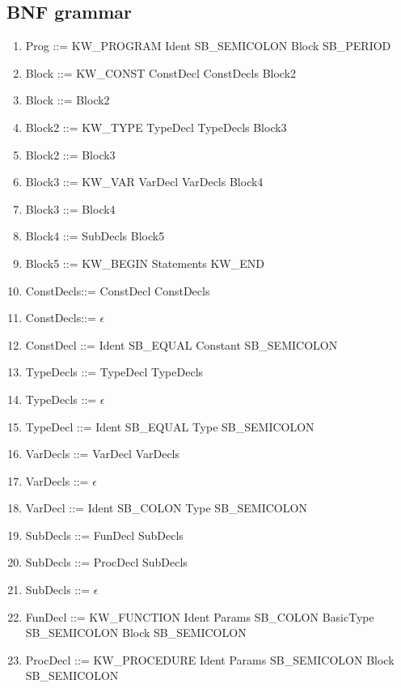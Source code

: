 \documentclass[12pt, a4paper]{report}
\begin{document}
			\subsection{BNF grammar}
				\begin{enumerate}
					\item Prog ::= KW\_PROGRAM Ident SB\_SEMICOLON Block SB\_PERIOD

					\item Block  ::= KW\_CONST ConstDecl ConstDecls Block2
					\item Block  ::= Block2

					\item Block2 ::= KW\_TYPE TypeDecl TypeDecls Block3
					\item Block2 ::= Block3

					\item Block3 ::= KW\_VAR VarDecl VarDecls Block4
					\item Block3 ::= Block4

					\item Block4 ::= SubDecls Block5
					\item Block5 ::= KW\_BEGIN Statements KW\_END

					\item ConstDecls::= ConstDecl ConstDecls
					\item ConstDecls::= $\epsilon$
					\item ConstDecl ::= Ident SB\_EQUAL Constant SB\_SEMICOLON

					\item TypeDecls ::= TypeDecl TypeDecls
					\item TypeDecls ::= $\epsilon$
					\item TypeDecl ::= Ident SB\_EQUAL Type SB\_SEMICOLON

					\item VarDecls ::= VarDecl VarDecls
					\item VarDecls ::= $\epsilon$
					\item VarDecl ::= Ident SB\_COLON Type SB\_SEMICOLON

					\item SubDecls ::= FunDecl SubDecls
					\item SubDecls ::= ProcDecl SubDecls
					\item SubDecls ::= $\epsilon$

					\item FunDecl ::= KW\_FUNCTION Ident Params SB\_COLON BasicType SB\_SEMICOLON Block SB\_SEMICOLON

					\item ProcDecl ::= KW\_PROCEDURE Ident Params SB\_SEMICOLON Block SB\_SEMICOLON


\end{enumerate}
\end{document}
